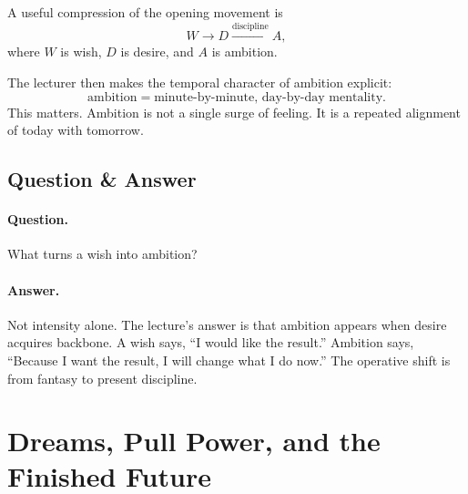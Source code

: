 A useful compression of the opening movement is
\begin{equation}
W \longrightarrow D \xrightarrow{\text{discipline}} A,
\end{equation}
where \(W\) is wish, \(D\) is desire, and \(A\) is ambition.

\begin{figure}
\centering
{}
\end{figure}

The lecturer then makes the temporal character of ambition explicit:
\begin{equation}
\text{ambition}=\text{minute-by-minute, day-by-day mentality}.
\end{equation}
This matters. Ambition is not a single surge of feeling. It is a repeated alignment of today with tomorrow.

\subsection{Question \& Answer}

\paragraph{Question.} What turns a wish into ambition?

\paragraph{Answer.} Not intensity alone. The lecture's answer is that ambition appears when desire acquires backbone. A wish says, ``I would like the result.'' Ambition says, ``Because I want the result, I will change what I do now.'' The operative shift is from fantasy to present discipline.

\section{Dreams, Pull Power, and the Finished Future}

